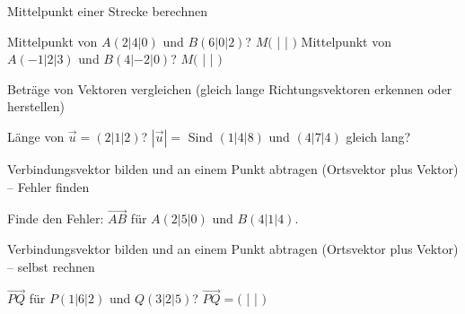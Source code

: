 \begin{aufgabe}{Mittelpunkt einer Strecke berechnen}
\begin{teile}
\teil Mittelpunkt von $A(2 | 4 | 0)$ und $B(6 | 0 | 2)$? $M($ \leerfeld | \leerfeld | \leerfeld $)$
\teil Mittelpunkt von $A(-1 | 2 | 3)$ und $B(4 | -2 | 0)$? $M($ \leerfeld | \leerfeld | \leerfeld $)$
\end{teile}
\end{aufgabe}

\begin{aufgabe}{Beträge von Vektoren vergleichen (gleich lange Richtungsvektoren erkennen oder herstellen)}
\begin{teile}
\teil Länge von $\vec{u} = (2 | 1 | 2)$? $|\vec{u}| = $ \leerfeld
\teil Sind $(1 | 4 | 8)$ und $(4 | 7 | 4)$ gleich lang? \janein
\end{teile}
\end{aufgabe}

\begin{aufgabe}{Verbindungsvektor bilden und an einem Punkt abtragen (Ortsvektor plus Vektor) – Fehler finden}
\begin{teile}
\teil Finde den Fehler: $\overrightarrow{AB}$ für $A(2 | 5 | 0)$ und $B(4 | 1 | 4)$. 
\end{teile}
\end{aufgabe}

\begin{aufgabe}{Verbindungsvektor bilden und an einem Punkt abtragen (Ortsvektor plus Vektor) – selbst rechnen}
\begin{teile}
\teil $\overrightarrow{PQ}$ für $P(1 | 6 | 2)$ und $Q(3 | 2 | 5)$? $\overrightarrow{PQ} = ($ \leerfeld | \leerfeld | \leerfeld $)$
\end{teile}
\end{aufgabe}
